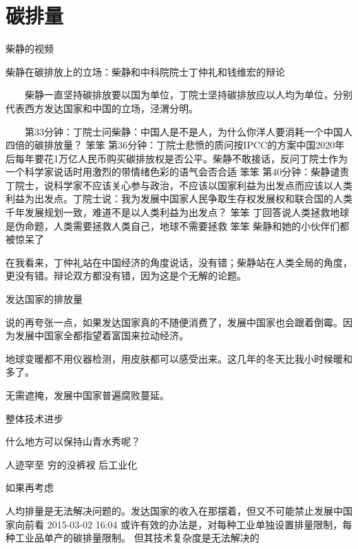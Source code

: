 \chapter{碳排量}
柴静的视频

柴静在碳排放上的立场：柴静和中科院院士丁仲礼和钱维宏的辩论

　　柴静一直坚持碳排放要以国为单位，丁院士坚持碳排放应以人均为单位，分别代表西方发达国家和中国的立场，泾渭分明。

　　第33分钟：丁院士问柴静：中国人是不是人，为什么你洋人要消耗一个中国人四倍的碳排放量？
 笨笨 
第36分钟：丁院士悲愤的质问按IPCC的方案中国2020年后每年要花1万亿人民币购买碳排放权是否公平。柴静不敢接话，反问丁院士作为一个科学家说话时用激烈的带情绪色彩的语气会否合适
 笨笨 
第40分钟：柴静谴责丁院士，说科学家不应该关心参与政治，不应该以国家利益为出发点而应该以人类利益为出发点。丁院士说：我为发展中国家人民争取生存权发展权和联合国的人类千年发展规划一致，难道不是以人类利益为出发点？
 笨笨 
丁回答说人类拯救地球是伪命题，人类需要拯救人类自己，地球不需要拯救
 笨笨 
柴静和她的小伙伴们都被惊呆了

在我看来，丁仲礼站在中国经济的角度说话，没有错；柴静站在人类全局的角度，更没有错。辩论双方都没有错，因为这是个无解的论题。

发达国家的排放量

说的再夸张一点，如果发达国家真的不随便消费了，发展中国家也会跟着倒霉。因为发展中国家全都指望着富国来拉动经济。

地球变暖都不用仪器检测，用皮肤都可以感受出来。这几年的冬天比我小时候暖和多了。

无需遮掩，发展中国家普遍腐败蔓延。

整体技术进步

什么地方可以保持山青水秀呢？

人迹罕至
穷的没裤衩
后工业化

如果再考虑

人均排量是无法解决问题的。发达国家的收入在那摆着，但又不可能禁止发展中国家向前看
2015-03-02 16:04
或许有效的办法是，对每种工业单独设置排量限制，每种工业品单产的碳排量限制。
但其技术复杂度是无法解决的
